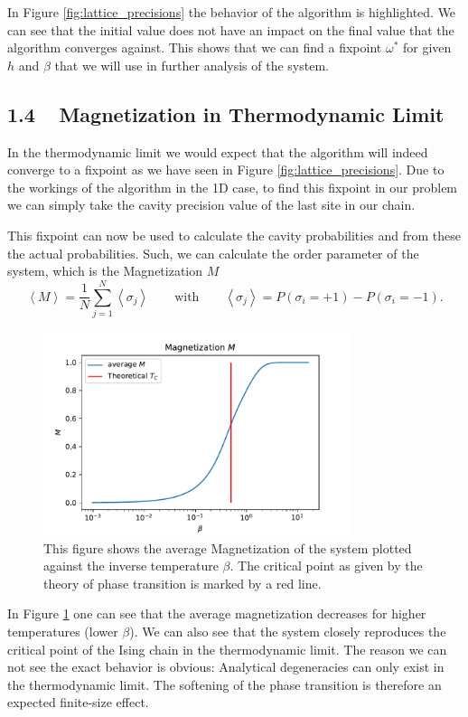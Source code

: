 \documentclass[main.tex]{subfiles}
\begin{document}
In Figure \ref{fig:lattice_precisions} the behavior of the algorithm is highlighted.
We can see that the initial value does not have an impact on the final value that the algorithm converges against.
This shows that we can find a fixpoint $\omega^{*}$ for given $h$ and $\beta$ that we will use in further analysis of the system.


\subsection*{1.4 \,\,\, Magnetization in Thermodynamic Limit}
In the thermodynamic limit we would expect that the algorithm will indeed converge to a fixpoint as we have seen in Figure \ref{fig:lattice_precisions}.
Due to the workings of the algorithm in the 1D case, to find this fixpoint in our problem we can simply take the cavity precision value of the last site in our chain.

This fixpoint can now be used to calculate the cavity probabilities and from these the actual probabilities.
Such, we can calculate the order parameter of the system, which is the Magnetization $M$  
\[
    \left<M \right> = \frac{1}{N} \sum_{j=1}^{N} \left<\sigma_j \right> \quad\quad
    \text{with} \quad\quad
    \left<\sigma_j \right> = P(\sigma_i = +1) - P(\sigma_i = -1)
.\] 

\begin{figure}[htpb]
    \centering
    \includegraphics[width=0.8\textwidth]{../figures/1_4_magnetization.pdf}
    \caption{
        This figure shows the average Magnetization of the system plotted against the inverse temperature $\beta$.
        The critical point as given by the theory of phase transition is marked by a red line.
    }
    \label{fig:magnetization}
\end{figure}

In Figure \ref{fig:magnetization} one can see that the average magnetization decreases for higher temperatures (lower $\beta$).
We can also see that the system closely reproduces the critical point of the Ising chain in the thermodynamic limit. 
The reason we can not see the exact behavior is obvious:
Analytical degeneracies can only exist in the thermodynamic limit.
The softening of the phase transition is therefore an expected finite-size effect.


\ifSubfilesClassLoaded{
}{
    \newpage
}
\end{document}
